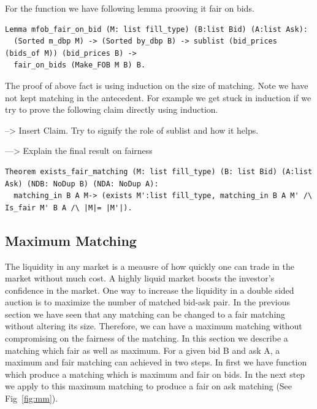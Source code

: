 \documentclass[a4paper,UKenglish,cleveref, autoref]{lipics-v2019}
\begin{document}
For the function  we have following lemma prooving it fair on bids. 
\begin{lemma}
\end{lemma}

\begin{verbatim}
Lemma mfob_fair_on_bid (M: list fill_type) (B:list Bid) (A:list Ask):
  (Sorted m_dbp M) -> (Sorted by_dbp B) -> sublist (bid_prices (bids_of M)) (bid_prices B) ->
  fair_on_bids (Make_FOB M B) B. 
\end{verbatim}
The proof of above fact is using induction on the size of matching. Note we have not kept matching in the antecedent. For example we get stuck in induction if we try to prove the following claim directly using induction.

--> Insert Claim.
Try to signify the role of sublist and how it helps. 

---> Explain the final result on fairness
\begin{verbatim}
Theorem exists_fair_matching (M: list fill_type) (B: list Bid) (A:list Ask) (NDB: NoDup B) (NDA: NoDup A):
  matching_in B A M-> (exists M':list fill_type, matching_in B A M' /\ Is_fair M' B A /\ |M|= |M'|).
\end{verbatim}


\subsection{Maximum Matching}

The liquidity in any market is a meausre of how quickly one can trade in the market without much cost. A highly liquid market boosts the investor's confidence in the market. One way to increase the liquidity in a double sided auction is to maximize the number of matched bid-ask pair. In the previous section we have seen that any matching can be changed to a fair matching without altering its size. Therefore, we can have a maximum matching without compromising on the fairness of the matching. In this section we describe a matching which fair as well as maximum. For a given bid B and ask A, a maximum and fair matching can achieved in two steps. In first we have function  which produce a matching which is maximum and fair on bids. In the next step we apply  to this maximum matching to produce a fair on ask matching (See Fig~\ref{fig:mm}).
\end{document}
